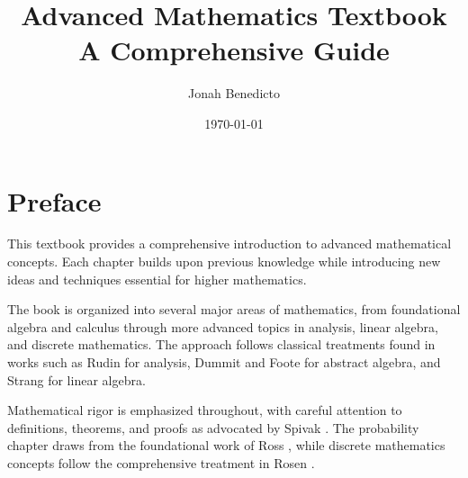 \documentclass[12pt,letterpaper]{book}
\title{Advanced Mathematics Textbook\\
       \large A Comprehensive Guide}
\author{Jonah Benedicto}
\date{\today}
\theoremstyle{definition}
\begin{document}
\maketitle

\frontmatter
\tableofcontents
\listoffigures
\listoftables

\chapter*{Preface}

This textbook provides a comprehensive introduction to advanced mathematical concepts. Each chapter builds upon previous knowledge while introducing new ideas and techniques essential for higher mathematics.

The book is organized into several major areas of mathematics, from foundational algebra and calculus through more advanced topics in analysis, linear algebra, and discrete mathematics. The approach follows classical treatments found in works such as Rudin \cite{rudin1976principles} for analysis, Dummit and Foote \cite{dummit2004abstract} for abstract algebra, and Strang \cite{strang2016introduction} for linear algebra.

Mathematical rigor is emphasized throughout, with careful attention to definitions, theorems, and proofs as advocated by Spivak \cite{spivak2008calculus}. The probability chapter draws from the foundational work of Ross \cite{ross2014first}, while discrete mathematics concepts follow the comprehensive treatment in Rosen \cite{rosen2019discrete}.

\mainmatter



\backmatter


\end{document}
